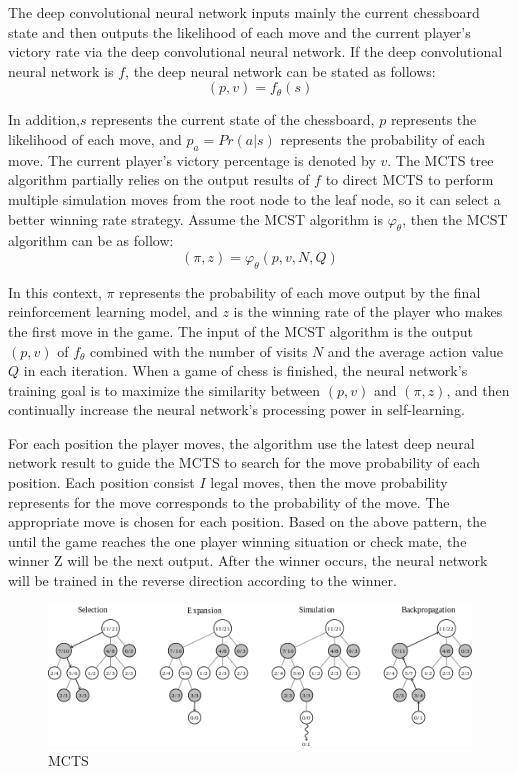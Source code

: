 \documentclass[10pt,twocolumn]{article}
\begin{document}
	The deep convolutional neural network inputs mainly the current chessboard state and then outputs the likelihood of each move and the current player's victory rate via the deep convolutional neural network. If the deep convolutional neural network is \(f\), the deep neural network can be stated as follows:
	\[(p,v)=f_\theta(s)\]
	
	In addition,\(s\) represents the current state of the chessboard, \(p\) represents the likelihood of each move, and $p_a = Pr (a|s)$ represents the probability of each move. The current player's victory percentage is denoted by \(v\). The MCTS tree algorithm partially relies on the output results of \(f\) to direct MCTS to perform multiple simulation moves from the root node to the leaf node, so it can select a better winning rate strategy. Assume the MCST algorithm is \(\varphi_\theta\), then the MCST algorithm can be as follow:
	\[(\pi,z)=\varphi_\theta(p,v,N,Q)\]
	
	In this context, \(\pi\) represents the probability of each move output by the final reinforcement learning model, and \(z\) is the winning rate of the player who makes the first move in the game. The input of the MCST algorithm is the output \((p,v)\) of \(f_\theta\) combined with the number of visits \(N\) and the average action value \(Q\) in each iteration. When a game of chess is finished, the neural network's training goal is to maximize the similarity between $(p, v)$ and $(\pi, z)$, and then continually increase the neural network's processing power in self-learning.
	
	For each position the player moves, the algorithm use the latest deep neural network result to guide the MCTS to search for the move probability of each position. Each position consist \(I\) legal moves, then the move probability represents for the move corresponds to the probability of the move. The appropriate move is chosen for each position. Based on the above pattern, the until the game reaches the one player winning situation or check mate, the winner Z will be the next output. After the winner occurs, the neural network will be trained in the reverse direction according to the winner.
	
	\begin{figure}
        \includegraphics[width=\linewidth]{MCTS.png}
        \caption{MCTS}
        \label{fig1:Monte Carlo Tree search}
    \end{figure}
	
\end{document}
